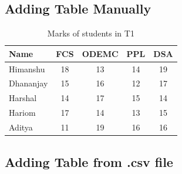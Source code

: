 \documentclass[12pt]{article}
\begin{document}
\subsection{Adding Table Manually}
\begin{table}[h]
\begin{center}
\caption{Marks of students in T1}
\label{tab:Table 1} 
\vspace{5mm}
\begin{tabular}{|p{2cm}|c|c|c|c|}
\hline
\textbf{Name} & \textbf{FCS} & \textbf{ODEMC} & \textbf{PPL} & 				\textbf{DSA}\\
\hline
Himanshu  & 18 & 13 & 14 & 19\\
Dhananjay & 15 & 16 & 12 & 17\\
Harshal & 14 & 17 & 15 & 14\\
Hariom & 17 & 14 & 13 & 15\\
Aditya & 11 & 19 & 16 & 16\\
\hline

\end{tabular}
\end{center}	
\end{table}



\subsection{Adding Table from .csv file}
\begin{table}[h]
\centering
{}
\end{table}
\end{document}
